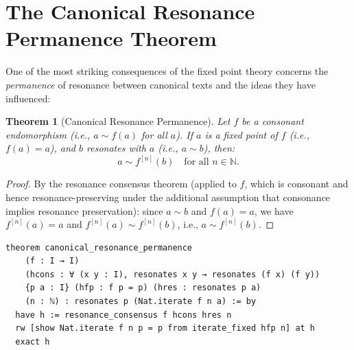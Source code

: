 \documentclass[11pt,openany]{book}
\theoremstyle{definition}
\theoremstyle{plain}
\newtheorem{theorem}[axiom]{Theorem}
\theoremstyle{remark}
\newcommand{\res}{\sim}                      %
\begin{document}
\section{The Canonical Resonance Permanence Theorem}

One of the most striking consequences of the fixed point theory concerns the \emph{permanence} of resonance between canonical texts and the ideas they have influenced:

\begin{theorem}[Canonical Resonance Permanence]
\label{thm:canonical-permanence}
Let $f$ be a consonant endomorphism (i.e., $a \res f(a)$ for all $a$). If $a$ is a fixed point of $f$ (i.e., $f(a) = a$), and $b$ resonates with $a$ (i.e., $a \res b$), then:
\[
a \res f^{[n]}(b) \quad \text{for all } n \in \mathbb{N}.
\]
\end{theorem}

\begin{proof}
By the resonance consensus theorem (applied to $f$, which is consonant and hence resonance-preserving under the additional assumption that consonance implies resonance preservation): since $a \res b$ and $f(a) = a$, we have $f^{[n]}(a) = a$ and $f^{[n]}(a) \res f^{[n]}(b)$, i.e., $a \res f^{[n]}(b)$.
\end{proof}

\begin{lstlisting}
theorem canonical_resonance_permanence
    (f : I → I)
    (hcons : ∀ (x y : I), resonates x y → resonates (f x) (f y))
    {p a : I} (hfp : f p = p) (hres : resonates p a)
    (n : ℕ) : resonates p (Nat.iterate f n a) := by
  have h := resonance_consensus f hcons hres n
  rw [show Nat.iterate f n p = p from iterate_fixed hfp n] at h
  exact h
\end{lstlisting}
\end{document}
